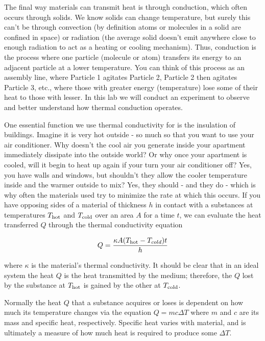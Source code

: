 The final way materials can transmit heat is through conduction, which often occurs through solids.  We know solids can change temperature, but surely this can't be through convection (by definition atoms or molecules in a solid are confined in space) or radiation (the average solid doesn't emit anywhere close to enough radiation to act as a heating or cooling mechanism).  Thus, conduction is the process where one particle (molecule or atom) transfers its energy to an adjacent particle at a lower temperature.  You can think of this process as an assembly line, where Particle 1 agitates Particle 2, Particle 2 then agitates Particle 3, etc., where those with greater energy (temperature) lose some of their heat to those with lesser.  In this lab we will conduct an experiment to observe and better understand how thermal conduction operates.\myskip

One essential function we use thermal conductivity for is the insulation of buildings.  Imagine it is very hot outside - so much so that you want to use your air conditioner.  Why doesn't the cool air you generate inside your apartment immediately dissipate into the outside world?  Or why once your apartment is cooled, will it begin to heat up again if your turn your air conditioner off?  Yes, you have walls and windows, but shouldn't they allow the cooler temperature inside and the warmer outside to mix?  Yes, they should - and they do - which is why often the materials used try to minimize the rate at which this occurs.  If you have opposing sides of a material of thickness $h$ in contact with a substances at temperatures $T_{\rm hot}$ and $T_{\rm cold}$ over an area $A$ for a time $t$, we can evaluate the heat transferred $Q$ through the thermal conductivity equation

\begin{equation}
\label{eq:thermcond}
Q=\frac{\kappa A(T_{\rm hot} - T_{cold})t}{h}
\end{equation}

\noindent where $\kappa$ is the material's thermal conductivity.  It should be clear that in an ideal system the heat $Q$ is the heat transmitted by the medium; therefore, the $Q$ lost by the substance at $T_{\rm hot}$ is gained by the other at $T_{\rm cold}$.\myskip

Normally the heat $Q$ that a substance acquires or loses is dependent on how much its temperature changes via the equation $Q=mc\Delta T$ where $m$ and $c$ are its mass and specific heat, respectively.  Specific heat varies with material, and is ultimately a measure of how much heat is required to produce some $\Delta T$.\myskip

